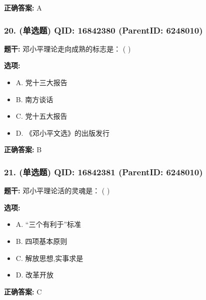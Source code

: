\documentclass[12pt,UTF8]{ctexart}
\begin{document}
\textbf{正确答案:}
A

\vspace{0.3em}\hrulefill\vspace{0.7em}

\subsubsection*{20. (单选题) \small QID: 16842380 (ParentID: 6248010)}

\textbf{题干:}
邓小平理论走向成熟的标志是： ( )



\textbf{选项:}
\begin{itemize}[leftmargin=*]

  \item A. 党十三大报告

  \item B. 南方谈话

  \item C. 党十五大报告

  \item D. 《邓小平文选》的出版发行

\end{itemize}

\textbf{正确答案:}
B

\vspace{0.3em}\hrulefill\vspace{0.7em}

\subsubsection*{21. (单选题) \small QID: 16842381 (ParentID: 6248010)}

\textbf{题干:}
邓小平理论活的灵魂是： ( )



\textbf{选项:}
\begin{itemize}[leftmargin=*]

  \item A. “三个有利于”标准

  \item B. 四项基本原则

  \item C. 解放思想,实事求是

  \item D. 改革开放

\end{itemize}

\textbf{正确答案:}
C
\end{document}
